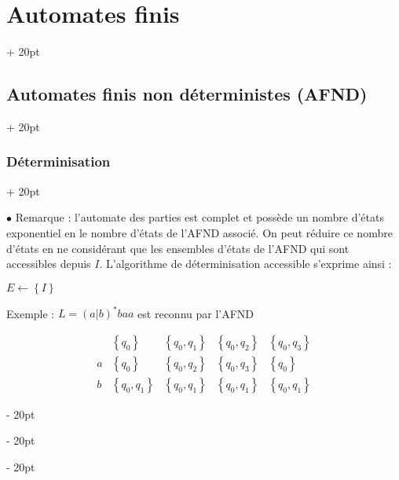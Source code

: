 \documentclass[a4paper, 12pt, twoside]{article}
\newenvironment{indalgo}[2][H]{
    \begin{algoBox}
        \begin{algorithm}[#1]
            \caption{#2}
}
{
        \end{algorithm}
    \end{algoBox}
}
\newcommand{\set}[1]{\left\{ #1 \right\}}
\newcommand{\ind}[1][20pt]{\advance\leftskip + #1}
\newcommand{\deind}[1][20pt]{\advance\leftskip - #1}
\newenvironment{indt}[2][20pt]{#2 \par \ind[#1]}{\par \deind} %
\begin{document}
\begin{indt}{\section{Automates finis}}
\begin{indt}{\subsection{Automates finis non déterministes (AFND)}}
\begin{indt}{\subsubsection{Déterminisation}}
                \vspace{12pt}
                
                $\bullet$ Remarque : l'automate des parties est complet et possède un nombre d'états exponentiel en le nombre d'états de l'AFND associé. On peut réduire ce nombre d'états en ne considérant que les ensembles d'états de l'AFND qui sont accessibles depuis $I$.
                L'algorithme de déterminisation accessible s'exprime ainsi :

                \vspace{6pt}
                
                \begin{indalgo}{Déterminisation accessible}
                    \label{alg:2}

                    $E \gets \set I$\;

                \end{indalgo}

                \vspace{12pt}
                
                Exemple : $L = (a | b)^*baa$ est reconnu par l'AFND

                \begin{center}
                \end{center}

                \[
                    \begin{array}{lllll}
                        & \set{q_0} & \set{q_0, q_1} & \set{q_0, q_2} & \set{q_0, q_3}
                        \\
                        a & \set{q_0} & \set{q_0, q_2} & \set{q_0, q_3} & \set{q_0}
                        \\
                        b & \set{q_0, q_1} & \set{q_0, q_1} & \set{q_0, q_1} & \set{q_0, q_1}
                    \end{array}
                \]


\end{indt}
\end{indt}
\end{indt}
\end{document}
